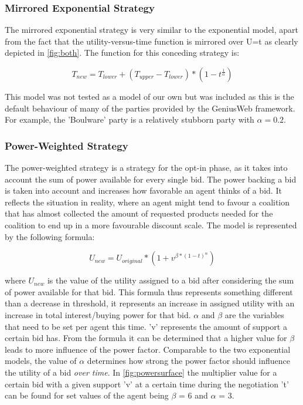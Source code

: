        \subsubsection*{Mirrored Exponential Strategy}
            The mirrored exponential strategy is very similar to the exponential model, apart from the fact that the utility-versus-time function is mirrored over U=t as clearly depicted in \autoref{fig:both}. The function for this conceding strategy is:
        
            \begin{equation}
            \label{mirroredexponential}
                T_{new} = T_{lower} + (T_{upper} - T_{lower}) * (1-t^\frac{1}{\alpha})
            \end{equation}

            This model was not tested as a model of our own but was included as this is the default behaviour of many of the parties provided by the GeniusWeb framework. For example, the 'Boulware' party is a relatively stubborn party with $\alpha = 0.2$. 
        
        \subsubsection*{Power-Weighted Strategy}
            The power-weighted strategy is a strategy for the opt-in phase, as it takes into account the sum of power available for every single bid. The power backing a bid is taken into account and increases how favorable an agent thinks of a bid. It reflects the situation in reality, where an agent might tend to favour a coalition that has almost collected the amount of requested products needed for the coalition to end up in a more favourable discount scale. The model is represented by the following formula:
            
            \begin{equation}
            \label{powerpar}
                U_{new} = U_{original} * ( 1+v^{\beta*(1-t)^\alpha } )
            \end{equation}
            
            where $U_{new}$ is the value of the utility assigned to a bid after considering the sum of power available for that bid. This formula thus represents something different than a decrease in threshold, it represents an increase in assigned utility with an increase in total interest/buying power for that bid.
            $\alpha$ and $\beta$ are the variables that need to be set per agent this time. 'v' represents the amount of support a certain bid has. 
            From the formula it can be determined that a higher value for $\beta$ leads to more influence of the power factor. Comparable to the two exponential models, the value of $\alpha$ determines how strong the power factor should influence the utility of a bid \textit{over time}.
            In \autoref{fig:powersurface} the multiplier value for a certain bid with a given support 'v' at a certain time during the negotiation 't' can be found for set values of the agent being $\beta$ = 6 and $\alpha$ = 3.
